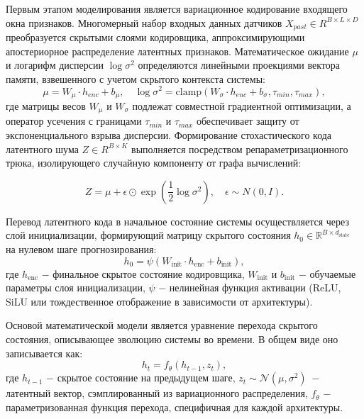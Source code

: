 \documentclass[14pt, a4paper, oneside]{extreport}
\begin{document}
Первым этапом моделирования является вариационное кодирование входящего окна признаков. Многомерный набор входных данных датчиков $X_{past} \in R^{B \times L \times D}$ преобразуется скрытыми слоями кодировщика, аппроксимирующими апостериорное распределение латентных признаков. Математическое ожидание $\mu$ и логарифм дисперсии $\log \sigma^2$ определяются линейными проекциями вектора памяти, взвешенного с учетом скрытого контекста системы:
\begin{equation}
\mu = W_{\mu} \cdot h_{enc} + b_{\mu}, \quad \log \sigma^2 = \text{clamp}\left(W_{\sigma} \cdot h_{enc} + b_{\sigma}, \tau_{min}, \tau_{max}\right),
\end{equation}
где матрицы весов $W_{\mu}$ и $W_{\sigma}$ подлежат совместной градиентной оптимизации, а оператор усечения с границами $\tau_{min}$ и $\tau_{max}$ обеспечивает защиту от экспоненциального взрыва дисперсии. Формирование стохастического кода латентного шума $Z \in R^{B \times K}$ выполняется посредством репараметризационного трюка, изолирующего случайную компоненту от графа вычислений:

\begin{equation}
Z = \mu + \epsilon \odot \exp\left(\frac{1}{2} \log \sigma^2\right), \quad \epsilon \sim N(0, I).
\end{equation}

Перевод латентного кода в начальное состояние системы осуществляется через слой инициализации, формирующий матрицу скрытого состояния $h_0 \in \mathbb{R}^{B \times d_{\text{state}}}$ на нулевом шаге прогнозирования:
\begin{equation}
h_0 = \psi\left(W_{\text{init}} \cdot h_{\text{enc}} + b_{\text{init}}\right),
\end{equation}
где $h_{\text{enc}}$ $-$ финальное скрытое состояние кодировщика, $W_{\text{init}}$ и $b_{\text{init}}$ $-$ обучаемые параметры слоя инициализации, $\psi$ $-$ нелинейная функция активации (ReLU, SiLU или тождественное отображение в зависимости от архитектуры).

Основой математической модели является уравнение перехода скрытого состояния, описывающее эволюцию системы во времени. В общем виде оно записывается как:
\begin{equation}
h_t = f_{\theta}\left(h_{t-1}, z_t\right),
\end{equation}
где $h_{t-1}$ $-$ скрытое состояние на предыдущем шаге, $z_t \sim \mathcal{N}(\mu, \sigma^2)$~$-$ латентный вектор, сэмплированный из вариационного распределения, $f_{\theta}$ $-$ параметризованная функция перехода, специфичная для каждой архитектуры.
\end{document}
